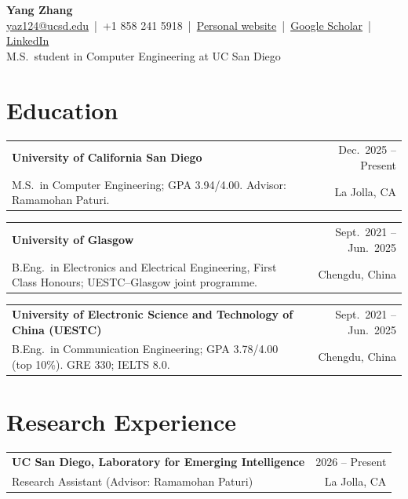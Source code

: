 \documentclass[10pt,letterpaper]{article}
\makeatletter
\newcommand{\entry}[4]{%
  \begin{tabularx}{\linewidth}{@{}X r@{}}
    \textbf{#1} & #2 \\
    #3 & #4 \\
  \end{tabularx}\par}
\makeatother
\begin{document}
\begin{center}
  {\LARGE\bfseries Yang Zhang}\\[3pt]
  \href{mailto:yaz124@ucsd.edu}{yaz124@ucsd.edu} \,|\,
  +1 858 241 5918 \,|\,
  \href{https://zzzz1991zzzz.github.io/Personal-Webpage/}{Personal website} \,|\,
  \href{https://scholar.google.com/citations?user=IVB_6X4AAAAJ&hl=en}{Google Scholar} \,|\,
  \href{https://www.linkedin.com/in/yang-zhang-8b2181442/}{LinkedIn}\\[2pt]
  M.S.\ student in Computer Engineering at UC San Diego
\end{center}

\section{Education}
\entry{University of California San Diego}{Dec.\ 2025 -- Present}
      {M.S.\ in Computer Engineering; GPA 3.94/4.00. Advisor: Ramamohan Paturi.}{La Jolla, CA}
\vspace{2pt}
\entry{University of Glasgow}{Sept.\ 2021 -- Jun.\ 2025}
      {B.Eng.\ in Electronics and Electrical Engineering, First Class Honours; UESTC--Glasgow joint programme.}{Chengdu, China}
\vspace{2pt}
\entry{University of Electronic Science and Technology of China (UESTC)}{Sept.\ 2021 -- Jun.\ 2025}
      {B.Eng.\ in Communication Engineering; GPA 3.78/4.00 (top 10\%). GRE 330; IELTS 8.0.}{Chengdu, China}

\section{Research Experience}
\entry{UC San Diego, Laboratory for Emerging Intelligence}{2026 -- Present}
      {Research Assistant (Advisor: Ramamohan Paturi)}{La Jolla, CA}
\end{document}
